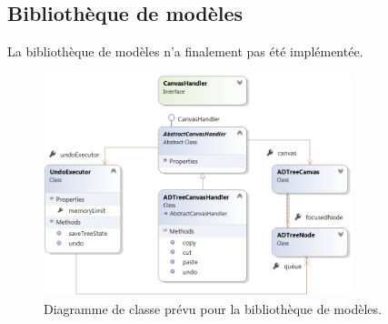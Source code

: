 	\subsection{Bibliothèque de modèles}
		La bibliothèque de modèles n'a finalement pas été implémentée.
		\begin{figure}
            \centering
                \includegraphics[width=0.8\textwidth]{figure/ctrlzReel.png}
            \caption{Diagramme de classe prévu pour la bibliothèque de modèles.}
            \label{fig:library}
        \end{figure}